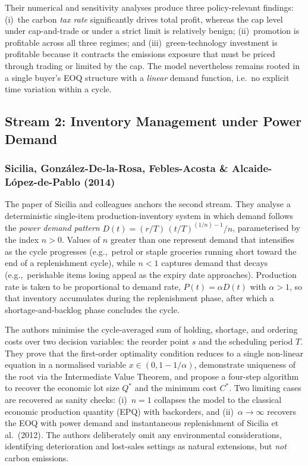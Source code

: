 \documentclass[11pt,a4paper]{article}
\begin{document}
Their numerical and sensitivity analyses produce three policy-relevant
findings: (i)~the carbon \emph{tax rate} significantly drives total
profit, whereas the cap level under cap-and-trade or under a strict
limit is relatively benign; (ii)~promotion is profitable across all
three regimes; and (iii)~green-technology investment is profitable
because it contracts the emissions exposure that must be priced through
trading or limited by the cap. The model nevertheless remains rooted in
a single buyer's EOQ structure with a \emph{linear} demand function,
i.e.\ no explicit time variation within a cycle.

\subsection{Stream 2: Inventory Management under Power Demand}

\subsubsection*{Sicilia, Gonz\'alez-De-la-Rosa, Febles-Acosta \& Alcaide-L\'opez-de-Pablo (2014)}

The paper of Sicilia and colleagues anchors the second stream. They
analyse a deterministic single-item production-inventory system in which
demand follows the \emph{power demand pattern}
$D(t) = (r/T)\,(t/T)^{(1/n)-1}/n$, parameterised by the index $n>0$.
Values of $n$ greater than one represent demand that
intensifies as the cycle progresses (e.g.,\ petrol or staple
groceries running short toward the end of a replenishment cycle), while
$n<1$ captures demand that decays (e.g.,\ perishable items losing
appeal as the expiry date approaches). Production rate is taken to be
proportional to demand rate, $P(t)=\alpha D(t)$ with $\alpha>1$, so that
inventory accumulates during the replenishment phase, after which a
shortage-and-backlog phase concludes the cycle.

The authors minimise the cycle-averaged sum of holding, shortage, and
ordering costs over two decision variables: the reorder point $s$ and
the scheduling period $T$. They prove that the first-order optimality
condition reduces to a single non-linear equation in a normalised
variable $x \in (0, 1-1/\alpha)$, demonstrate uniqueness of the root via
the Intermediate Value Theorem, and propose a four-step algorithm to
recover the economic lot size $Q^{*}$ and the minimum cost $C^{*}$.
Two limiting cases are recovered as sanity checks: (i)~$n=1$ collapses
the model to the classical economic production quantity (EPQ) with
backorders, and (ii)~$\alpha\to\infty$ recovers the EOQ with power
demand and instantaneous replenishment of Sicilia et al.\ (2012). The
authors deliberately omit any environmental considerations, identifying
deterioration and lost-sales settings as natural extensions, but
\emph{not} carbon emissions.
\end{document}
